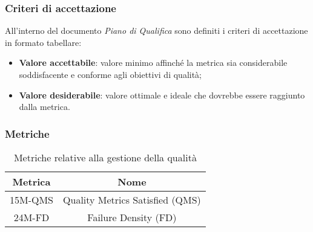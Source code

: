 \subsubsection{Criteri di accettazione}
All'interno del documento \textit{Piano di Qualifica} sono definiti i criteri di accettazione in formato tabellare:
\begin{itemize}
	\item \textbf{Valore accettabile}: valore minimo affinché la metrica sia considerabile soddisfacente e conforme agli obiettivi di qualità;
	\item \textbf{Valore desiderabile}: valore ottimale e ideale che dovrebbe essere raggiunto dalla metrica.
\end{itemize}

\subsubsection{Metriche}
\begin{table}[h]
	\centering
	\caption{Metriche relative alla gestione della qualità}
	\begin{tabular}{|c|c|}
		\hline
		\textbf{Metrica} & \textbf{Nome}                   \\
		\hline
		15M-QMS          & Quality Metrics Satisfied (QMS) \\
		24M-FD           & Failure Density (FD)            \\
		\hline
	\end{tabular}
\end{table}
